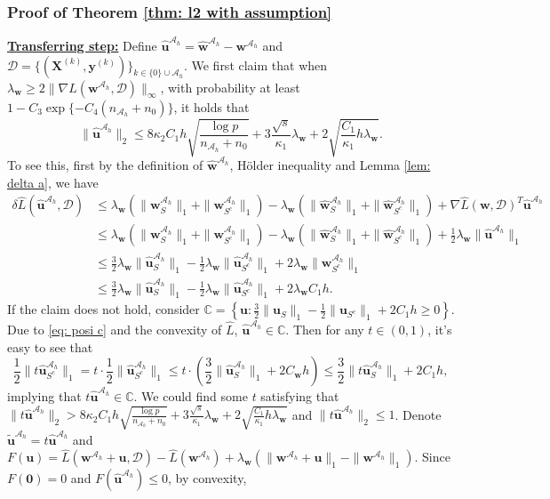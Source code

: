 \documentclass[12pt]{article}
\newcommand{\infnorm}[1]{\|#1\|_{\infty}}
\newcommand{\twonorm}[1]{\|#1\|_{2}}
\newcommand{\onenorm}[1]{\|#1\|_{1}}
\newcommand{\byk}[1]{\bm{y}^{(#1)}}
\newcommand{\bXk}[1]{\bm{X}^{(#1)}}
\newcommand{\bu}{\bm{u}}
\newcommand{\huah}{\hat{\bm{u}}^{\mathcal{A}_h}}
\newcommand{\bw}{\bm{w}}
\newcommand{\bwah}{\bm{w}^{\mathcal{A}_h}}
\newcommand{\hwah}{\hat{\bm{w}}^{\mathcal{A}_h}}
\newcommand{\mah}{\mathcal{A}_h}
\newcommand{\md}{\mathcal{D}}
\newcommand{\nah}{n_{\mathcal{A}_h}}
\newcommand{\transet}{\{0\}\cup \mah}
\newcommand{\<}{\langle}
\renewcommand{\>}{\rangle}
\begin{document}
\subsubsection{Proof of Theorem \ref{thm: l2 with assumption}}\label{subsubsec: proof of thm 1}
\underline{\textbf{Transferring step:}}	Define $\huah = \hwah - \bwah$ and $\mathcal{D} = \{(\bXk{k}, \byk{k})\}_{k \in \transet}$. We first claim that when $\lambda_{\bw} \geq 2\infnorm{\nabla L(\bwah, \md)}$, with probability at least $1-C_3\exp\{-C_4(\nah + n_0)\}$, it holds that
	\begin{equation}\label{eq: claim}
		\twonorm{\huah} \leq  8\kappa_2C_1h\sqrt{\frac{\log p}{\nah + n_0}} + 3\frac{\sqrt{s}}{\kappa_1}\lambda_{\bw} + 2\sqrt{\frac{C_1}{\kappa_1}h\lambda_{\bw}}.
	\end{equation}
	To see this, first by the definition of $\hwah$, H\"older inequality and Lemma \ref{lem: delta a}, we have
	\begin{align}
		\delta \hat{L}(\huah, \md) &\leq \lambda_{\bw}(\onenorm{\bwah_S} + \onenorm{\bwah_{S^c}}) - \lambda_{\bw}(\onenorm{\hwah_S} + \onenorm{\hwah_{S^c}}) + \nabla \hat{L}(\bw, \md)^T\huah \\
		&\leq  \lambda_{\bw}(\onenorm{\bwah_S} + \onenorm{\bwah_{S^c}}) - \lambda_{\bw}(\onenorm{\hwah_S} + \onenorm{\hwah_{S^c}}) + \frac{1}{2}\lambda_{\bw}\onenorm{\huah} \\
		&\leq \frac{3}{2}\lambda_{\bw}\onenorm{\huah_S} - \frac{1}{2}\lambda_{\bw}\onenorm{\huah_{S^c}} + 2\lambda_{\bw}\onenorm{\bwah_{S^c}} \\
		&\leq \frac{3}{2}\lambda_{\bw}\onenorm{\huah_S} - \frac{1}{2}\lambda_{\bw}\onenorm{\huah_{S^c}} + 2\lambda_{\bw}C_1h. \label{eq: posi c}
	\end{align}
	If the claim does not hold, consider $\mathds{C} = \left\{\bu: \frac{3}{2}\onenorm{\bu_S} - \frac{1}{2}\onenorm{\bu_{S^c}} + 2C_1h \geq 0\right\}$. Due to \eqref{eq: posi c} and the convexity of $\hat{L}$, $\huah \in \mathds{C}$. Then for any $t \in (0,1)$, it's easy to see that
	\begin{equation}
		\frac{1}{2}\onenorm{t\huah_{S^c}} = t\cdot \frac{1}{2}\onenorm{\huah_{S^c}} \leq t\cdot \left(\frac{3}{2}\onenorm{\huah_{S}} + 2C_{\bw}h\right) \leq \frac{3}{2}\onenorm{t\huah_{S}} + 2C_1h,
	\end{equation}
	implying that $t\huah \in \mathds{C}$. We could find some $t$ satisfying that $\twonorm{t\huah} > 8\kappa_2C_1h\sqrt{\frac{\log p}{\nah + n_0}} + 3\frac{\sqrt{s}}{\kappa_1}\lambda_{\bw} + 2\sqrt{\frac{C_1}{\kappa_1}h\lambda_{\bw}}$ and $\twonorm{t\huah} \leq 1$. Denote $\tilde{\bu}^{\mah} = t\huah$ and $F(\bu) = \hat{L}(\bwah + \bu, \md) - \hat{L}(\bwah) + \lambda_{\bw}(\onenorm{\bwah + \bu} - \onenorm{\bwah})$. Since $F(\bm{0}) = 0$ and $F(\huah) \leq 0$, by convexity,
\end{document}

